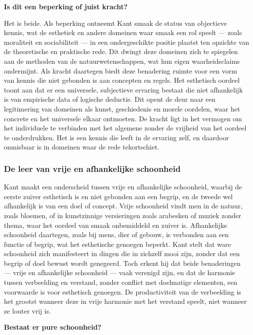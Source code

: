 \documentclass[11pt,twoside,openright]{memoir}
\begin{document}
\bigskip
\noindent
\textbf{Is dit een beperking of juist kracht?}
\medskip

Het is beide. Als beperking ontneemt Kant smaak de status van objectieve kennis, wat de esthetiek en andere domeinen waar smaak een rol speelt — zoals moraliteit en sociabiliteit — in een ondergeschikte positie plaatst ten opzichte van de theoretische en praktische rede. Dit dwingt deze domeinen zich te spiegelen aan de methoden van de natuurwetenschappen, wat hun eigen waarheidsclaims ondermijnt.
Als kracht daartegen biedt deze benadering ruimte voor een vorm van kennis die niet gebonden is aan concepten en regels. Het esthetisch oordeel toont aan dat er een universele, subjectieve ervaring bestaat die niet afhankelijk is van empirische data of logische deductie. Dit opent de deur naar een legitimering van domeinen als kunst, geschiedenis en morele oordelen, waar het concrete en het universele elkaar ontmoeten. De kracht ligt in het vermogen om het individuele te verbinden met het algemene zonder de vrijheid van het oordeel te onderdrukken. Het is een kennis die leeft in de ervaring zelf, en daardoor onmisbaar is in domeinen waar de rede tekortschiet.

\subsubsection{De leer van vrije en afhankelijke schoonheid}

Kant maakt een onderscheid tussen vrije en afhankelijke schoonheid, waarbij de eerste zuiver esthetisch is en niet gebonden aan een begrip, en de tweede wel afhankelijk is van een doel of concept. Vrije schoonheid vindt men in de natuur, zoals bloemen, of in kunstzinnige versieringen zoals arabesken of muziek zonder thema, waar het oordeel van smaak onbemiddeld en zuiver is. Afhankelijke schoonheid daartegen, zoals bij mens, dier of gebouw, is verbonden aan een functie of begrip, wat het esthetische genoegen beperkt. Kant stelt dat ware schoonheid zich manifesteert in dingen die in zichzelf mooi zijn, zonder dat een begrip of doel bewust wordt genegeerd. Toch erkent hij dat beide benaderingen — vrije en afhankelijke schoonheid — vaak verenigd zijn, en dat de harmonie tussen verbeelding en verstand, zonder conflict met doelmatige elementen, een voorwaarde is voor esthetisch genoegen. De productiviteit van de verbeelding is het grootst wanneer deze in vrije harmonie met het verstand speelt, niet wanneer ze louter vrij is.

\bigskip
\noindent
\textbf{Bestaat er pure schoonheid?}
\medskip
\end{document}
